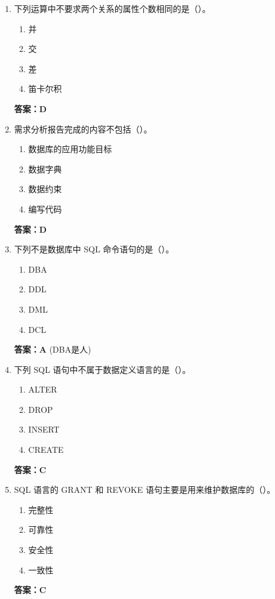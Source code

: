 \documentclass[12pt, a4paper]{article}
\begin{document}
\begin{enumerate}[label=\arabic*.]
    \item 下列运算中不要求两个关系的属性个数相同的是（\quad）。
    \begin{enumerate}
        \item 并
        \item 交
        \item 差
        \item 笛卡尔积
    \end{enumerate}
    \textbf{答案：D}

    \item 需求分析报告完成的内容不包括（\quad）。
    \begin{enumerate}
        \item 数据库的应用功能目标
        \item 数据字典
        \item 数据约束
        \item 编写代码
    \end{enumerate}
    \textbf{答案：D}

    \item 下列不是数据库中 SQL 命令语句的是（\quad）。
    \begin{enumerate}
        \item DBA
        \item DDL
        \item DML
        \item DCL
    \end{enumerate}
    \textbf{答案：A} (DBA是人)

    \item 下列 SQL 语句中不属于数据定义语言的是（\quad）。
    \begin{enumerate}
        \item ALTER
        \item DROP
        \item INSERT
        \item CREATE
    \end{enumerate}
    \textbf{答案：C}

    \item SQL 语言的 GRANT 和 REVOKE 语句主要是用来维护数据库的（\quad）。
    \begin{enumerate}
        \item 完整性
        \item 可靠性
        \item 安全性
        \item 一致性
    \end{enumerate}
    \textbf{答案：C}


\end{enumerate}
\end{document}
